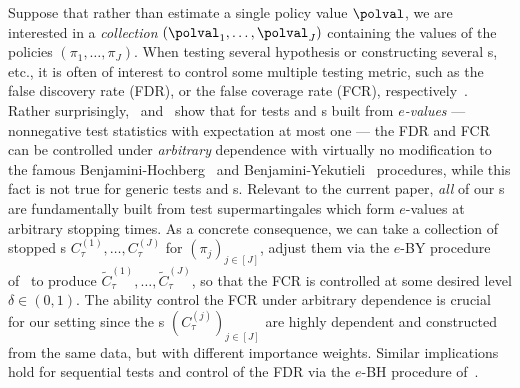 Suppose that rather than estimate a single policy value $\polval$, we are interested in a \emph{collection} $(\polval_1, \dots, \polval_J)$ containing the values of the policies $(\pi_1, \dots, \pi_J)$. When testing several hypothesis or constructing several \ci{}s, etc., it is often of interest to control some multiple testing metric, such as the false discovery rate (FDR), or the false coverage rate (FCR), respectively~\citep{benjamini1995controlling,benjamini2005false}. Rather surprisingly,~\citet{wang2020false} and~\citet{xu2022post} show that for tests and \ci{}s built from \emph{$e$-values} --- nonnegative test statistics with expectation at most one --- the FDR and FCR can be controlled under \emph{arbitrary} dependence with virtually no modification to the famous Benjamini-Hochberg~\citep{benjamini1995controlling} and Benjamini-Yekutieli~\citep{benjamini2005false} procedures, while this fact is not true for generic tests and \ci{}s. Relevant to the current paper, \emph{all} of our \cs{}s are fundamentally built from test supermartingales which form $e$-values at arbitrary stopping times. As a concrete consequence, we can take a collection of stopped \cs{}s $C_\tau^{(1)}, \dots, C_\tau^{(J)}$ for $(\pi_j)_{j \in [J]}$, adjust them via the $e$-BY procedure of~\citet{xu2022post} to produce $\widetilde C_\tau^{(1)}, \dots, \widetilde C_\tau^{(J)}$, so that the FCR is controlled at some desired level $\delta \in (0, 1)$. The ability control the FCR under arbitrary dependence is crucial for our setting since the \cs{}s $(C_\tau^{(j)})_{j\in[J]}$ are highly dependent and constructed from the same data, but with different importance weights. Similar implications hold for sequential tests and control of the FDR via the $e$-BH procedure of~\citet{wang2020false}.

